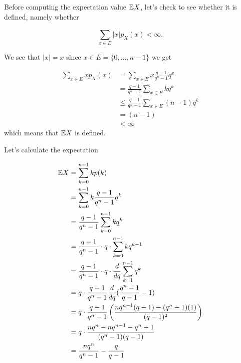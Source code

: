 
Before computing the expectation value $ \mathbb{E} X$, let's check to see whether it is defined, namely
whether

\[
    \sum_{x\in E}^{} |x| p_{X} (x) < \infty
.\] 

We see that $ |x| = x$ since $ x \in E = \{ 0,\dots, n-1 \} $ we get

\begin{align*}
    \sum_{x \in E}^{} x p_{X} (x) &= \sum_{x \in E}^{} x \frac{q-1}{q^{n} -1} q^{x}\\
				  &= \frac{q-1}{q^{n} -1}  \sum_{x\in E}^{} k q^{k} \\
				  &\leq \frac{q-1}{q^{n} -1} \sum_{x\in E} (n-1) q^{k} \\
				  &= (n-1)\\
				  &< \infty
\end{align*}
which means that $ \mathbb{E} X$ is defined.

Let's calculate the expectation

\begin{align*}
    \mathbb{E} X &= \sum_{k=0}^{n-1} k p(k) \\
	 &= \sum_{k=0}^{n-1} k \frac{q-1}{q^{n} -1} q^{k} \\
	 &= \frac{q-1}{q^{n} -1} \sum_{k=0}^{n-1} k q^{k} \\
	 &=  \frac{q-1}{q^{n} -1} \cdot q \cdot \sum_{k=0}^{n-1} k q^{k-1}\\
	 &= \frac{q-1}{q^{n} -1} \cdot q \cdot \frac{d}{dq} \sum_{k=1}^{n-1} q^{k} \\
	 &= q\cdot \frac{q-1}{q^{n} -1} \frac{d}{dq} ( \frac{q^{n} -1}{q-1} -1) \\
	 &= q \cdot \frac{q-1}{q^{n} -1} \left( \frac{n q^{n-1} (q-1) - (q^{n} -1)(1)}{(q-1)^2}
	 \right) \\
	 &= q \cdot \frac{n  q^{n} - n q^{n-1} - q^{n} +1 }{(q^{n} -1)(q-1)}\\
	 &= \frac{n q^{n} }{q^{n} -1} - \frac{q}{q-1} 
\end{align*}
